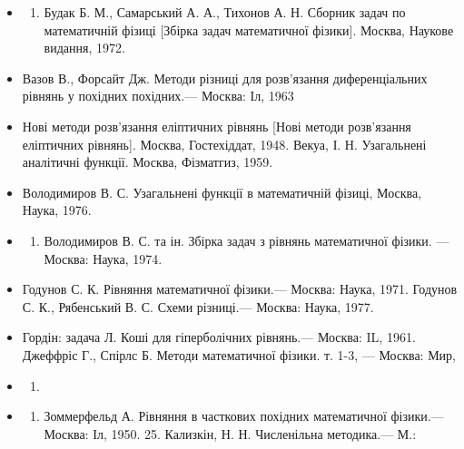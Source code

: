 \documentclass[
  ukrainian,
]{article}
\providecommand{\tightlist}{%
  \setlength{\itemsep}{0pt}\setlength{\parskip}{0pt}}
\begin{document}
\begin{itemize}
\begin{enumerate}
  \tightlist
  \item
    Біцадзе А. В., Калініченко Д. К. Збірка задач з рівнянь математичної
    фізики. Москва, Наука, 1977.
  \end{enumerate}
\item
  \begin{enumerate}
  \def\labelenumi{\arabic{enumi}.}
  \setcounter{enumi}{13}
  \tightlist
  \item
    Будак Б. М., Самарський А. А., Тихонов А. Н. Сборник задач по
    математичній фізиці {[}Збірка задач математичної фізики{]}. Москва,
    Наукове видання, 1972.
  \end{enumerate}
\item
  Вазов В., Форсайт Дж. Методи різниці для розв'язання диференціальних
  рівнянь у похідних похідних.--- Москва: Іл, 1963
\item
  Нові методи розв'язання еліптичних рівнянь {[}Нові методи розв'язання
  еліптичних рівнянь{]}. Москва, Гостехіддат, 1948. Векуа, І. Н.
  Узагальнені аналітичні функції. Москва, Фізматгиз, 1959.
\item
  Володимиров В. С. Узагальнені функції в математичній фізиці, Москва,
  Наука, 1976.
\item
  \begin{enumerate}
  \def\labelenumi{\arabic{enumi}.}
  \setcounter{enumi}{18}
  \tightlist
  \item
    Володимиров В. С. та ін. Збірка задач з рівнянь математичної фізики.
    --- Москва: Наука, 1974.
  \end{enumerate}
\item
  Годунов С. К. Рівняння математичної фізики.--- Москва: Наука, 1971.
  Годунов С. К., Рябенський В. С. Схеми різниці.--- Москва: Наука, 1977.
\item
  Гордін: задача Л. Коші для гіперболічних рівнянь.--- Москва: IL, 1961.
  Джеффріс Г., Спірлс Б. Методи математичної фізики. т. 1-3, --- Москва:
  Мир,
\item
  \begin{enumerate}
  \def\labelenumi{\arabic{enumi}.}
  \setcounter{enumi}{1969}
  \tightlist
  \item
  \end{enumerate}
\item
  \begin{enumerate}
  \def\labelenumi{\arabic{enumi}.}
  \setcounter{enumi}{23}
  \tightlist
  \item
    Зоммерфельд А. Рівняння в часткових похідних математичної фізики.---
    Москва: Іл, 1950. 25. Кализкін, Н. Н. Численільна методика.--- М.:

\end{enumerate}
\end{itemize}
\end{document}
